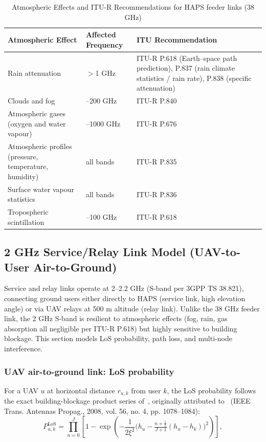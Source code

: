 \documentclass[conference]{IEEEtran}
\begin{document}
\begin{table}[t]
\centering
\caption{Atmospheric Effects and ITU-R Recommendations for HAPS feeder links (38 GHz)}
\label{tab:atmospheric_effects}
{\scriptsize\setlength{\tabcolsep}{3pt}
\begin{tabularx}{\columnwidth}{|>{\raggedright\arraybackslash}p{}|>{\raggedright\arraybackslash}p{}|>{\raggedright\arraybackslash}X|}
\hline
\textbf{Atmospheric Effect} & \textbf{Affected Frequency} & \textbf{ITU Recommendation}  \\
\hline
Rain attenuation & $>$1 GHz & ITU-R P.618 (Earth–space path prediction), P.837 (rain climate statistics / rain rate), P.838 (specific attenuation)\\
\hline
Clouds and fog & 1--200 GHz & ITU-R P.840\\
\hline
Atmospheric gases (oxygen and water vapour) & 1--1000 GHz & ITU-R P.676\\
\hline
Atmospheric profiles (pressure, temperature, humidity) & all bands & ITU-R P.835\\
\hline
Surface water vapour statistics & all bands & ITU-R P.836\\
\hline
Tropospheric scintillation & 1--100 GHz & ITU-R P.618\\
\hline
\end{tabularx}}
\end{table}

\subsection{2 GHz Service/Relay Link Model (UAV-to-User Air-to-Ground)}

Service and relay links operate at 2--2.2 GHz (S-band per 3GPP TS 38.821), connecting ground users either directly to HAPS (service link, high elevation angle) or via UAV relays at 500 m altitude (relay link). Unlike the 38 GHz feeder link, the 2 GHz S-band is resilient to atmospheric effects (fog, rain, gas absorption all negligible per ITU-R P.618) but highly sensitive to building blockage. This section models LoS probability, path loss, and multi-node interference.

\subsubsection{UAV air-to-ground link: LoS probability}
For a UAV $u$ at horizontal distance $r_{u,k}$ from user $k$, the LoS
probability follows the exact building-blockage product series
of~\cite{arani2023}, originally attributed to~\cite{holispechac2008} (IEEE Trans. Antennas Propag., 2008, vol. 56, no. 4, pp. 1078--1084):
\begin{equation}
P^\mathrm{LoS}_{u,k} = \prod_{n=0}^{J}\left[1-\exp\!\left(-\frac{1}{2\xi^2}
\Big(h_u-\tfrac{n+\frac12}{J+1}(h_u-h_k)\Big)^{2}\right)\right],
\label{eq:los}
\end{equation}
\end{document}
